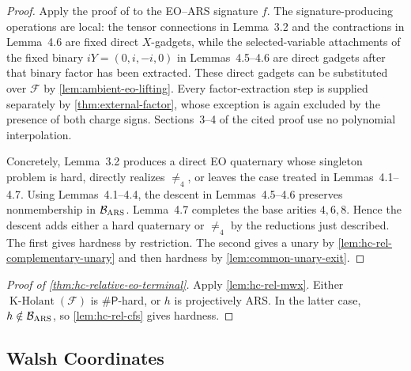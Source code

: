 \documentclass[11pt,letterpaper,onecolumn]{article}
\theoremstyle{plain}
\theoremstyle{definition}
\theoremstyle{remark}
\newcommand{\cF}{\mathcal F}
\newcommand{\KHolant}{\operatorname{K\text{-}Holant}}
\newcommand{\SharpP}{\#\mathsf P}
\newcommand{\Neq}{\neq}
\begin{document}
\begin{proof}
		Apply the proof of
		\cite[Lemmas~3.2 and~4.1--4.7; Theorem~4.8]{CaiFuShao2020ARS} to the
		EO--ARS signature \(f\). The signature-producing operations are local: the tensor connections in Lemma~3.2 and the contractions in Lemma~4.6 are
		fixed direct \(X\)-gadgets, while the selected-variable attachments of the fixed
		binary \(iY=(0,i,-i,0)\) in Lemmas~4.5--4.6 are direct gadgets after that
		binary factor has been extracted.  These direct gadgets can be substituted over
		\(\cF\) by
		\cref{lem:ambient-eo-lifting}. Every factor-extraction step is supplied
		separately by \cref{thm:external-factor}, whose exception is again excluded
		by the presence of both charge signs.  Sections~3--4 of the cited proof use no polynomial
		interpolation.
		
		Concretely, Lemma~3.2 produces a direct EO quaternary whose singleton problem
		is hard, directly realizes \(\Neq_4\), or leaves the case treated in
		Lemmas~4.1--4.7. Using Lemmas~4.1--4.4, the descent in Lemmas~4.5--4.6
		preserves nonmembership in \(\mathcal B_{\rm ARS}\).
		Lemma~4.7 completes the base arities \(4,6,8\).
		Hence the descent adds either a hard quaternary
		or \(\Neq_4\) by the reductions just described.  The first gives hardness by restriction.
		The second gives a unary by \cref{lem:hc-rel-complementary-unary} and then
		hardness by \cref{lem:common-unary-exit}.
	\end{proof}
	
	\begin{proof}[Proof of \cref{thm:hc-relative-eo-terminal}]
		Apply \cref{lem:hc-rel-mwx}.  Either \(\KHolant(\cF)\) is
		\(\SharpP\)-hard, or \(h\) is projectively ARS.  In the latter case,
		\(h\notin\mathcal B_{\rm ARS}\), so \cref{lem:hc-rel-cfs} gives hardness.
	\end{proof}
	

	
	
	\subsection{Walsh Coordinates}
\label{subsec:walsh-local}
\end{document}
